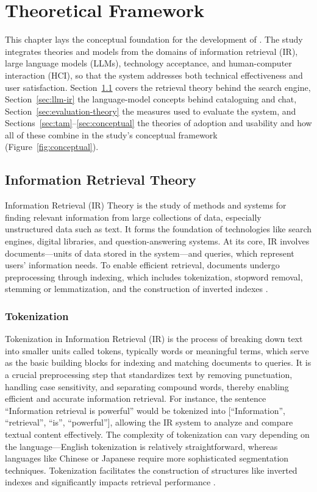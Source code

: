 \chapter{Theoretical Framework}\label{ch:framework}

This chapter lays the conceptual foundation for the development of \cs{}. The study integrates theories and models from the domains of information retrieval (IR), large language models (LLMs), technology acceptance, and human-computer interaction (HCI), so that the system addresses both technical effectiveness and user satisfaction. Section~\ref{sec:ir-theory} covers the retrieval theory behind the search engine, Section~\ref{sec:llm-ir} the language-model concepts behind cataloguing and chat, Section~\ref{sec:evaluation-theory} the measures used to evaluate the system, and Sections~\ref{sec:tam}--\ref{sec:conceptual} the theories of adoption and usability and how all of these combine in the study's conceptual framework (Figure~\ref{fig:conceptual}).

\section{Information Retrieval Theory}\label{sec:ir-theory}

Information Retrieval (IR) Theory is the study of methods and systems for finding relevant information from large collections of data, especially unstructured data such as text. It forms the foundation of technologies like search engines, digital libraries, and question-answering systems. At its core, IR involves documents---units of data stored in the system---and queries, which represent users' information needs. To enable efficient retrieval, documents undergo preprocessing through indexing, which includes tokenization, stopword removal, stemming or lemmatization, and the construction of inverted indexes \citep{manning2008}.

\subsection{Tokenization}\label{sec:tokens}

Tokenization in Information Retrieval (IR) is the process of breaking down text into smaller units called tokens, typically words or meaningful terms, which serve as the basic building blocks for indexing and matching documents to queries. It is a crucial preprocessing step that standardizes text by removing punctuation, handling case sensitivity, and separating compound words, thereby enabling efficient and accurate information retrieval. For instance, the sentence ``Information retrieval is powerful'' would be tokenized into [``Information'', ``retrieval'', ``is'', ``powerful''], allowing the IR system to analyze and compare textual content effectively. The complexity of tokenization can vary depending on the language---English tokenization is relatively straightforward, whereas languages like Chinese or Japanese require more sophisticated segmentation techniques. Tokenization facilitates the construction of structures like inverted indexes and significantly impacts retrieval performance \citep{jurafsky2023}.

